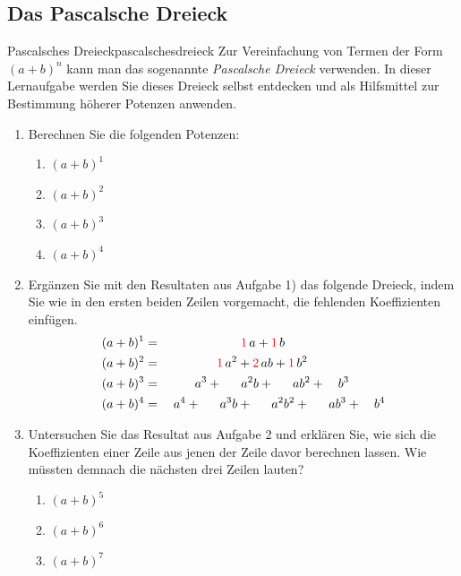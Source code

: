 \subsection{Das Pascalsche Dreieck}
\begin{LA}{Pascalsches Dreieck}{pascalschesdreieck}
    Zur Vereinfachung von Termen der Form \((a+b)^n\) kann man das sogenannte \textit{Pascalsche Dreieck} verwenden. In dieser Lernaufgabe werden Sie dieses Dreieck selbst entdecken und als Hilfsmittel zur Bestimmung höherer Potenzen anwenden.

    \begin{enumerate}
        \item Berechnen Sie die folgenden Potenzen:
              \begin{enumerate}
                  \item \((a+b)^1\)
                  \item \((a+b)^2\)
                  \item \((a+b)^3\)
                  \item \((a+b)^4\)
              \end{enumerate}

        \item Ergänzen Sie mit den Resultaten aus Aufgabe 1) das folgende Dreieck, indem Sie wie in den ersten beiden Zeilen vorgemacht, die fehlenden Koeffizienten einfügen.
              \[
                  \begin{aligned}
                      (a+b)^1 & = \phantom{a^4+4a^3+6a^2}{\color{red}1}\,a+{\color{red}1}\,b                              \\
                      (a+b)^2 & = \phantom{a^4+4a^3+}{\color{red}1}\,a^2+{\color{red}2}\,ab+{\color{red}1}\,b^2           \\
                      (a+b)^3 & = \phantom{a^4+4}a^3+\phantom{1}\quad a^2b+\phantom{1}\quad ab^2+\quad b^3                \\
                      (a+b)^4 & = \quad a^4+\phantom{1}\quad a^3b+\phantom{1}\quad a^2b^2+\phantom{1}\quad ab^3+\quad b^4
                  \end{aligned}
              \]

        \item Untersuchen Sie das Resultat aus Aufgabe 2 und erklären Sie, wie sich die Koeffizienten einer Zeile aus jenen der Zeile davor berechnen lassen. Wie müssten demnach die nächsten drei Zeilen lauten?
              \begin{enumerate}
                  \item \((a+b)^5\)
                  \item \((a+b)^6\)
                  \item \((a+b)^7\)
              \end{enumerate}


\end{enumerate}
\end{LA}
